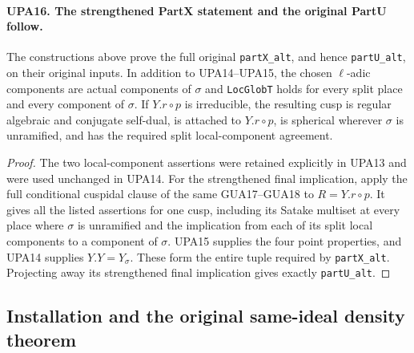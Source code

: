 \documentclass[11pt,a4paper]{article}
\numberwithin{equation}{section}
\theoremstyle{remark}\newtheorem{remark}[theorem]{Remark}
\begin{document}
\paragraph{UPA16. The strengthened PartX statement and the original PartU follow.}
\label{claim:UPA16}
The constructions above prove the full original
\texttt{part\allowbreak X\_\allowbreak alt}, and hence \texttt{part\allowbreak U\_\allowbreak alt}, on
their original inputs.
In addition to UPA14--UPA15, the chosen $\ell$-adic components
are actual components of $\sigma$ and
\texttt{Loc\allowbreak Glob\allowbreak T} holds for every split place and every
component of $\sigma$.  If $Y.r\circ p$ is irreducible,
the resulting cusp is regular algebraic and conjugate
self-dual, is attached to $Y.r\circ p$, is spherical
wherever $\sigma$ is unramified, and has the required
split local-component agreement.
\begin{proof}
The two local-component assertions were retained
explicitly in UPA13 and were used unchanged in UPA14.
For the strengthened final implication, apply the
full conditional cuspidal clause of the same
GUA17--GUA18 to $R=Y.r\circ p$.
It gives all the listed assertions for one cusp,
including its Satake multiset at every place where
$\sigma$ is unramified and the implication from each
of its split local components to a component of
$\sigma$.  UPA15 supplies the four point properties,
and UPA14 supplies $Y.Y=Y_\sigma$.  These form the
entire tuple required by \texttt{part\allowbreak X\_\allowbreak alt}.
Projecting away its strengthened final implication
gives exactly \texttt{part\allowbreak U\_\allowbreak alt}.
\end{proof}

\subsection{Installation and the original same-ideal density theorem}

\end{document}
